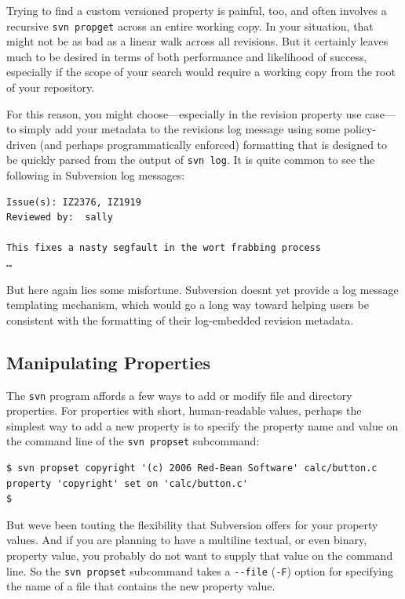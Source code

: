 Trying to find a custom versioned property is painful, too, and often
involves a recursive \texttt{svn\ propget} across an entire working
copy. In your situation, that might not be as bad as a linear walk
across all revisions. But it certainly leaves much to be desired in
terms of both performance and likelihood of success, especially if the
scope of your search would require a working copy from the root of your
repository.

For this reason, you might choose---especially in the revision property
use case---to simply add your metadata to the revision\textquotesingle s
log message using some policy-driven (and perhaps programmatically
enforced) formatting that is designed to be quickly parsed from the
output of \texttt{svn\ log}. It is quite common to see the following in
Subversion log messages:

\begin{verbatim}
Issue(s): IZ2376, IZ1919
Reviewed by:  sally

This fixes a nasty segfault in the wort frabbing process
…
\end{verbatim}

But here again lies some misfortune. Subversion doesn\textquotesingle t
yet provide a log message templating mechanism, which would go a long
way toward helping users be consistent with the formatting of their
log-embedded revision metadata.

\subsection{Manipulating Properties}\label{svn.advanced.props.manip}

The \texttt{svn} program affords a few ways to add or modify file and
directory properties. For properties with short, human-readable values,
perhaps the simplest way to add a new property is to specify the
property name and value on the command line of the \texttt{svn\ propset}
subcommand:

\begin{verbatim}
$ svn propset copyright '(c) 2006 Red-Bean Software' calc/button.c
property 'copyright' set on 'calc/button.c'
$
\end{verbatim}

But we\textquotesingle ve been touting the flexibility that Subversion
offers for your property values. And if you are planning to have a
multiline textual, or even binary, property value, you probably do not
want to supply that value on the command line. So the
\texttt{svn\ propset} subcommand takes a \texttt{-\/-file} (\texttt{-F})
option for specifying the name of a file that contains the new property
value.

